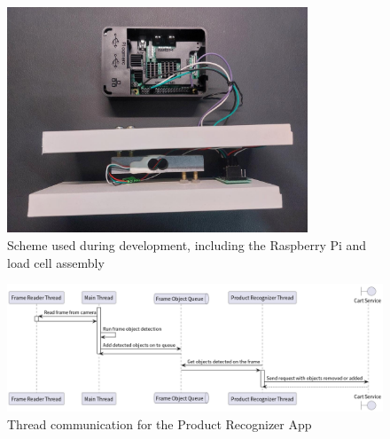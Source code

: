 \documentclass[openright]{normas-utf-tex} %
\begin{document}
\begin{figure}[H]
	\centering
	\includegraphics[width=0.8\textwidth]{./images/raspberrypiwithloadcell.jpeg}
	\caption[Scheme used during development, including the Raspberry Pi and load cell assembly]{Scheme used during development, including the Raspberry Pi and load cell assembly}
	\label{fig:dummy}
\end{figure}

\begin{figure}[H]
	\centering
	\includegraphics[width=1\textwidth]{./images/Product Recognizer Thread communication.png}
	\caption[Thread communication for the Product Recognizer App]{Thread communication for the Product Recognizer App}
	\label{fig:dummy}
\end{figure}
\end{document}
